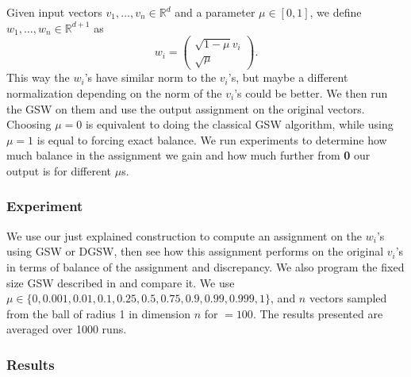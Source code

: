 \documentclass[12pt]{article}
\begin{document}
Given input vectors $v_1,\dots,v_n\in\mathbb{R}^d$ and a parameter $\mu\in[0,1]$, we define $w_1,\dots,w_n\in\mathbb{R}^{d+1}$ as $$w_i=\begin{pmatrix}\sqrt{1-\mu}v_i \\ \sqrt{\mu}\end{pmatrix}.$$ This way the $w_i$'s have similar norm to the $v_i$'s, but maybe a different normalization depending on the norm of the $v_i$'s could be better. We then run the GSW on them and use the output assignment on the original vectors. Choosing $\mu=0$ is equivalent to doing the classical GSW algorithm, while using $\mu=1$ is equal to forcing exact balance. We run experiments to determine how much balance in the assignment we gain and how much further from \textbf{0} our output is for different $\mu$s.

\subsubsection{Experiment}
We use our just explained construction to compute an assignment on the $w_i$'s using GSW or DGSW, then see how this assignment performs on the original $v_i$'s in terms of balance of the assignment and discrepancy. We also program the fixed size GSW described in \cite{harshaw2019balancing} and compare it. We use $\mu\in\{0,0.001,0.01,0.1,0.25,0.5,0.75,0.9,0.99,0.999,1\}$, and $n$ vectors sampled from the ball of radius 1 in dimension $n$ for $=100$. The results presented are averaged over 1000 runs.

\subsubsection{Results}
\end{document}
